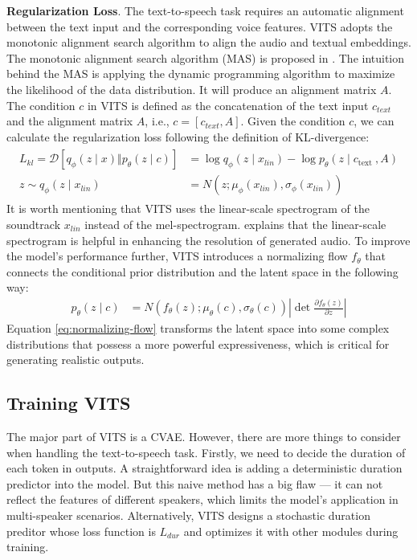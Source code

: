 \documentclass{article}
\begin{document}
\textbf{Regularization Loss}. The text-to-speech task requires an automatic alignment between the text input and the corresponding voice features. VITS adopts the monotonic alignment search algorithm to align the audio and textual embeddings. The monotonic alignment search algorithm (MAS) is proposed in \cite{2020kim}. The intuition behind the MAS is applying the dynamic programming algorithm to maximize the likelihood of the data distribution. It will produce an alignment matrix $A$. The condition $c$ in VITS is defined as the concatenation of the text input $c_{text}$ and the alignment matrix $A$, i.e., $c = [c_{text}, A]$. Given the condition $c$, we can calculate the regularization loss following the definition of KL-divergence:
\begin{align}
    \begin{split}
        L_{kl} = \mathcal{D}\left[q_{\phi}(z \mid x) \Vert p_{\theta}(z \mid c) \right]&=\log q_{\phi}\left(z \mid x_{l i n}\right)-\log p_{\theta}\left(z \mid c_{\text {text }}, A\right) \\
        z \sim q_{\phi}\left(z \mid x_{l i n}\right)&=N\left(z ; \mu_{\phi}\left(x_{l i n}\right), \sigma_{\phi}\left(x_{l i n}\right)\right)
    \end{split}
\end{align}
It is worth mentioning that VITS uses the linear-scale spectrogram of the soundtrack $x_{lin}$ instead of the mel-spectrogram. \cite{2021kim} explains that the linear-scale spectrogram is helpful in enhancing the resolution of generated audio. To improve the model's performance further, VITS introduces a normalizing flow $f_\theta$ that connects the conditional prior distribution and the latent space in the following way:
\begin{align}
    p_{\theta}(z \mid c) & =N\left(f_{\theta}(z) ; \mu_{\theta}(c), \sigma_{\theta}(c)\right)\left|\operatorname{det} \frac{\partial f_{\theta}(z)}{\partial z}\right| 
    \label{eq:normalizing-flow}
\end{align}
Equation \ref{eq:normalizing-flow} transforms the latent space into some complex distributions that possess a more powerful expressiveness, which is critical for generating realistic outputs.

\subsection{Training VITS}
The major part of VITS is a CVAE. However, there are more things to consider when handling the text-to-speech task. Firstly, we need to decide the duration of each token in outputs. A straightforward idea is adding a deterministic duration predictor into the model. But this naive method has a big flaw --- it can not reflect the features of different speakers, which limits the model's application in multi-speaker scenarios. Alternatively, VITS designs a stochastic duration preditor whose loss function is $L_{dur}$ and optimizes it with other modules during training.
\end{document}
